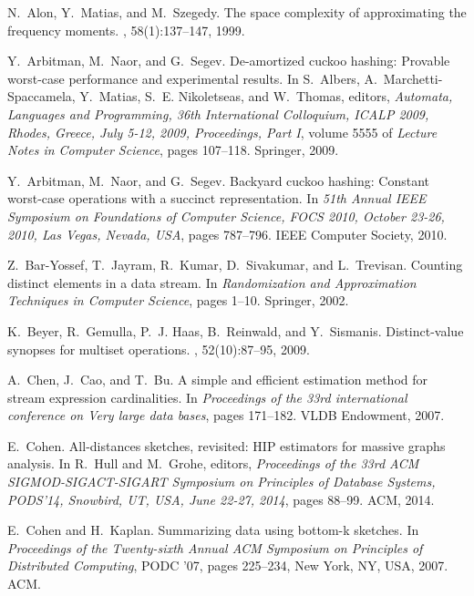 \documentclass{article}
\begin{document}
\begin{thebibliography}{10}

N.~Alon, Y.~Matias, and M.~Szegedy.
\newblock The space complexity of approximating the frequency moments.
, 58(1):137--147, 1999.

Y.~Arbitman, M.~Naor, and G.~Segev.
\newblock De-amortized cuckoo hashing: Provable worst-case performance and
  experimental results.
\newblock In S.~Albers, A.~Marchetti{-}Spaccamela, Y.~Matias, S.~E.
  Nikoletseas, and W.~Thomas, editors, {\em Automata, Languages and
  Programming, 36th International Colloquium, {ICALP} 2009, Rhodes, Greece,
  July 5-12, 2009, Proceedings, Part {I}}, volume 5555 of {\em Lecture Notes in
  Computer Science}, pages 107--118. Springer, 2009.

Y.~Arbitman, M.~Naor, and G.~Segev.
\newblock Backyard cuckoo hashing: Constant worst-case operations with a
  succinct representation.
\newblock In {\em 51th Annual {IEEE} Symposium on Foundations of Computer
  Science, {FOCS} 2010, October 23-26, 2010, Las Vegas, Nevada, {USA}}, pages
  787--796. {IEEE} Computer Society, 2010.

Z.~Bar-Yossef, T.~Jayram, R.~Kumar, D.~Sivakumar, and L.~Trevisan.
\newblock Counting distinct elements in a data stream.
\newblock In {\em Randomization and Approximation Techniques in Computer
  Science}, pages 1--10. Springer, 2002.

K.~Beyer, R.~Gemulla, P.~J. Haas, B.~Reinwald, and Y.~Sismanis.
\newblock Distinct-value synopses for multiset operations.
, 52(10):87--95, 2009.

A.~Chen, J.~Cao, and T.~Bu.
\newblock A simple and efficient estimation method for stream expression
  cardinalities.
\newblock In {\em Proceedings of the 33rd international conference on Very
  large data bases}, pages 171--182. VLDB Endowment, 2007.

E.~Cohen.
\newblock All-distances sketches, revisited: {HIP} estimators for massive
  graphs analysis.
\newblock In R.~Hull and M.~Grohe, editors, {\em Proceedings of the 33rd {ACM}
  {SIGMOD-SIGACT-SIGART} Symposium on Principles of Database Systems, PODS'14,
  Snowbird, UT, USA, June 22-27, 2014}, pages 88--99. {ACM}, 2014.

E.~Cohen and H.~Kaplan.
\newblock Summarizing data using bottom-k sketches.
\newblock In {\em Proceedings of the Twenty-sixth Annual ACM Symposium on
  Principles of Distributed Computing}, PODC '07, pages 225--234, New York, NY,
  USA, 2007. ACM.


\end{thebibliography}
\end{document}
